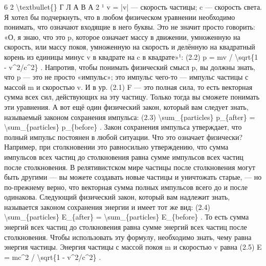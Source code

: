 \documentclass[10pt,oneside]{article}
\begin{document}
6 2 \textbackslash{}textbullet\{\} Г Л А В А  2 ¹ v = |v| --- скорость частицы; c --- скорость света. Я хотел бы подчеркнуть, что в любом физическом уравнении необходимо понимать, что означают входящие в него буквы. Это не значит просто говорить: «О, я знаю, что это p, которое означает массу в движении, умноженную на скорость, или массу покоя, умноженную на скорость и делённую на квадратный корень из единицы минус v в квадрате на c в квадрате»¹: (2.2) p = mv / \textbackslash{}sqrt\{1 - v\textasciicircum{}2/c\textasciicircum{}2\} . Напротив, чтобы понимать физический смысл p, вы должны знать, что p --- это не просто «импульс»; это импульс чего-то --- импульс частицы с массой m и скоростью v. И в ур. (2.1) F --- это полная сила, то есть векторная сумма всех сил, действующих на эту частицу. Только тогда вы сможете понимать эти уравнения. А вот ещё один физический закон, который вам следует знать, называемый законом сохранения импульса: (2.3) \textbackslash{}sum\_\{particles\} p\_\{after\} = \textbackslash{}sum\_\{particles\} p\_\{before\} . Закон сохранения импульса утверждает, что полный импульс постоянен в любой ситуации. Что это означает физически? Например, при столкновении это равносильно утверждению, что сумма импульсов всех частиц до столкновения равна сумме импульсов всех частиц после столкновения. В релятивистском мире частицы после столкновения могут быть другими --- вы можете создавать новые частицы и уничтожать старые, --- но по-прежнему верно, что векторная сумма полных импульсов всего до и после одинакова. Следующий физический закон, который вам надлежит знать, называется законом сохранения энергии и имеет тот же вид: (2.4) \textbackslash{}sum\_\{particles\} E\_\{after\} = \textbackslash{}sum\_\{particles\} E\_\{before\} . То есть сумма энергий всех частиц до столкновения равна сумме энергий всех частиц после столкновения. Чтобы использовать эту формулу, необходимо знать, чему равна энергия частицы. Энергия частицы с массой покоя m и скоростью v равна (2.5) E = mc\textasciicircum{}2 / \textbackslash{}sqrt\{1 - v\textasciicircum{}2/c\textasciicircum{}2\} .\par
\end{document}
